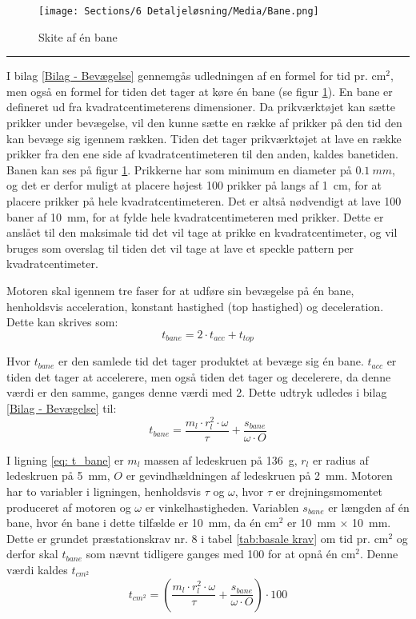 \begin{figure}[H]
    \centering
    \texttt{[image: Sections/6 Detaljeløsning/Media/Bane.png]}
    \caption{Skite af én bane}
    \label{fig: Skite bane}
\end{figure}\plainbreak{-.5}

I bilag \ref{Bilag - Bevægelse} gennemgås udledningen af en formel for tid pr. cm\(^2\), men også en formel for tiden det tager at køre én bane (se figur \ref{fig: Skite bane}).
En bane er defineret ud fra kvadratcentimeterens dimensioner. Da prikværktøjet kan sætte prikker under bevægelse, vil den kunne sætte en række af prikker på den tid den kan bevæge sig igennem rækken. Tiden det tager prikværktøjet at lave en række prikker fra den ene side af kvadratcentimeteren til den anden, kaldes banetiden. Banen kan ses på figur \ref{fig: Skite bane}. Prikkerne har som minimum en diameter på $\SI{0,1}{mm}$, og det er derfor muligt at placere højest 100 prikker på langs af \SI{1}{cm}, for at placere prikker på hele kvadratcentimeteren. Det er altså nødvendigt at lave 100 baner af \SI{10}{mm}, for at fylde hele kvadratcentimeteren med prikker. Dette er anslået til den maksimale tid det vil tage at prikke en kvadratcentimeter, og vil bruges som overslag til tiden det vil tage at lave et speckle pattern per kvadratcentimeter.

Motoren skal igennem tre faser for at udføre sin bevægelse på én bane, henholdsvis acceleration, konstant hastighed (top hastighed) og deceleration. Dette kan skrives som:
\begin{equation}
    t_{bane}=2\cdot t_{acc}+t_{top}
\end{equation}

Hvor \(t_{bane}\) er den samlede tid det tager produktet at bevæge sig én bane. \(t_{acc}\) er tiden det tager at accelerere, men også tiden det tager og decelerere, da denne værdi er den samme, ganges denne værdi med 2. Dette udtryk udledes i bilag \ref{Bilag - Bevægelse} til:
\begin{equation}
    t_{bane}=\dfrac{m_{l}\cdot r_{l}^2\cdot \omega}{\tau}+\dfrac{s_{bane}}{\omega\cdot O}
    \label{eq: t_bane}
\end{equation}

I ligning \ref{eq: t_bane} er \(m_{l}\) massen af ledeskruen på \SI{136}{g}, \(r_{l}\) er radius af ledeskruen på \SI{5}{mm}, \(O\) er gevindhældningen af ledeskruen på \SI{2}{mm}. Motoren har to variabler i ligningen, henholdsvis \(\tau\) og \(\omega\), hvor \(\tau\) er drejningsmomentet produceret af motoren og \(\omega\) er vinkelhastigheden. Variablen \(s_{bane}\) er længden af én bane, hvor én bane i dette tilfælde er \SI{10}{mm}, da én cm\(^2\) er \SI{10}{mm} \(\times\) \SI{10}{mm}. Dette er grundet præstationskrav nr. 8 i tabel \ref{tab:basale krav} om tid pr. cm\(^2\) og derfor skal \(t_{bane}\) som nævnt tidligere ganges med 100 for at opnå én cm\(^2\). Denne værdi  kaldes \(t_{cm^2}\)
 \begin{equation}
      t_{cm^2}=\left(\dfrac{m_{l}\cdot r_{l}^2\cdot \omega}{\tau}+\dfrac{s_{bane}}{\omega\cdot O}\right) \cdot 100
      \label{eq:tcm2}
 \end{equation}

